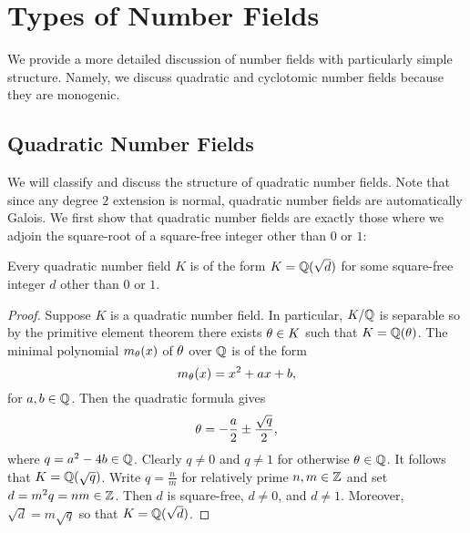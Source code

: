 \chapter{Types of Number Fields}
  We provide a more detailed discussion of number fields with particularly simple structure. Namely, we discuss quadratic and cyclotomic number fields because they are monogenic.
  \section{Quadratic Number Fields}
    We will classify and discuss the structure of quadratic number fields. Note that since any degree $2$ extension is normal, quadratic number fields are automatically Galois. We first show that quadratic number fields are exactly those where we adjoin the square-root of a square-free integer other than $0$ or $1$:

    \begin{proposition}\label{prop:classification_of_quadratic_number_fields}
      Every quadratic number field $K$ is of the form $K = \mathbb{Q}(\sqrt{d})$ for some square-free integer $d$ other than $0$ or $1$.
    \end{proposition}
    \begin{proof}
      Suppose $K$ is a quadratic number field. In particular, $K/\mathbb{Q}$ is separable so by the primitive element theorem there exists $\theta \in K$ such that $K = \mathbb{Q}(\theta)$. The minimal polynomial $m_{\theta}(x)$ of $\theta$ over $\mathbb{Q}$ is of the form
      \[
        m_{\theta}(x) = x^{2}+ax+b,
      \]
      for $a,b \in \mathbb{Q}$. Then the quadratic formula gives
      \[
        \theta = -\frac{a}{2}\pm\frac{\sqrt{q}}{2},
      \]
      where $q = a^{2}-4b \in \mathbb{Q}$. Clearly $q \neq 0$ and $q \neq 1$ for otherwise $\theta \in \mathbb{Q}$. It follows that $K = \mathbb{Q}(\sqrt{q})$. Write $q = \frac{n}{m}$ for relatively prime $n,m \in \mathbb{Z}$ and set $d = m^{2}q = nm \in \mathbb{Z}$. Then $d$ is square-free, $d \neq 0$, and $d \neq 1$. Moreover, $\sqrt{d} = m\sqrt{q}$ so that $K = \mathbb{Q}(\sqrt{d})$. 
    \end{proof}

